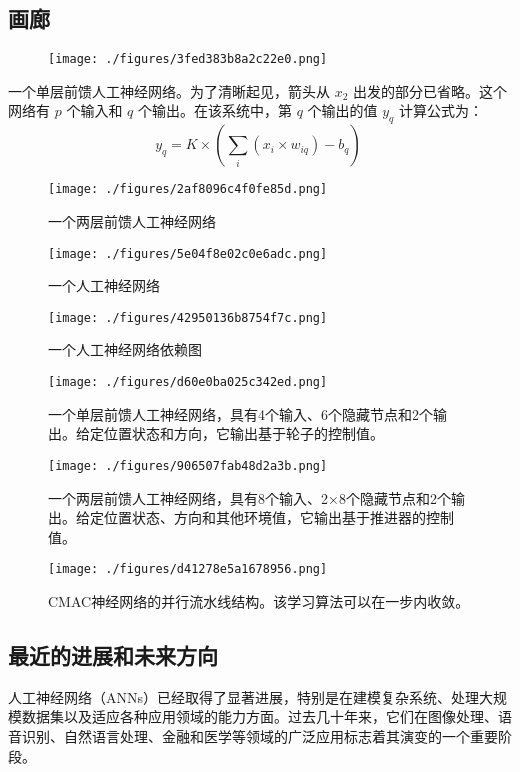 \subsection{画廊}
\begin{figure}[ht]
\centering
\texttt{[image: ./figures/3fed383b8a2c22e0.png]}
\caption{} \label{fig_RGSJ_6}
\end{figure}
一个单层前馈人工神经网络。为了清晰起见，箭头从 \( x_2 \) 出发的部分已省略。这个网络有 \( p \) 个输入和 \( q \) 个输出。在该系统中，第 \( q \) 个输出的值 \( y_q \) 计算公式为：
\[
y_q = K \times \left( \sum_i (x_i \times w_{iq}) - b_q \right)~
\]
\begin{figure}[ht]
\centering
\texttt{[image: ./figures/2af8096c4f0fe85d.png]}
\caption{一个两层前馈人工神经网络} \label{fig_RGSJ_7}
\end{figure}
\begin{figure}[ht]
\centering
\texttt{[image: ./figures/5e04f8e02c0e6adc.png]}
\caption{一个人工神经网络} \label{fig_RGSJ_8}
\end{figure}
\begin{figure}[ht]
\centering
\texttt{[image: ./figures/42950136b8754f7c.png]}
\caption{一个人工神经网络依赖图} \label{fig_RGSJ_9}
\end{figure}
\begin{figure}[ht]
\centering
\texttt{[image: ./figures/d60e0ba025c342ed.png]}
\caption{一个单层前馈人工神经网络，具有4个输入、6个隐藏节点和2个输出。给定位置状态和方向，它输出基于轮子的控制值。} \label{fig_RGSJ_10}
\end{figure}
\begin{figure}[ht]
\centering
\texttt{[image: ./figures/906507fab48d2a3b.png]}
\caption{一个两层前馈人工神经网络，具有8个输入、2×8个隐藏节点和2个输出。给定位置状态、方向和其他环境值，它输出基于推进器的控制值。} \label{fig_RGSJ_11}
\end{figure}
\begin{figure}[ht]
\centering
\texttt{[image: ./figures/d41278e5a1678956.png]}
\caption{CMAC神经网络的并行流水线结构。该学习算法可以在一步内收敛。} \label{fig_RGSJ_12}
\end{figure}
\subsection{最近的进展和未来方向}  
人工神经网络（ANNs）已经取得了显著进展，特别是在建模复杂系统、处理大规模数据集以及适应各种应用领域的能力方面。过去几十年来，它们在图像处理、语音识别、自然语言处理、金融和医学等领域的广泛应用标志着其演变的一个重要阶段。
